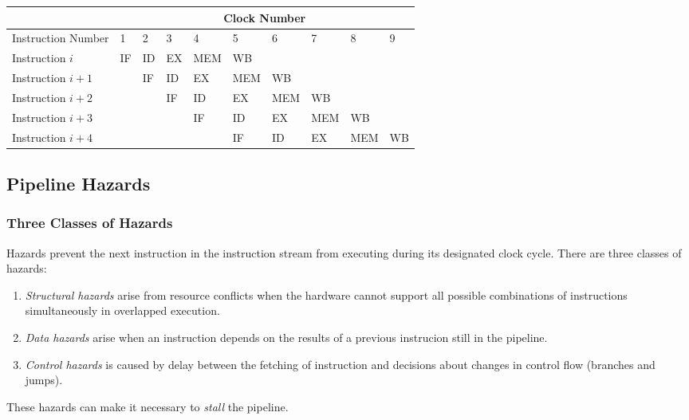 \documentclass[12pt, a4paper]{article}
\theoremstyle{margin}
\begin{document}
      \begin{table}[H]
      \centering
      \begin{tabular}{|l|l|l|l|l|l|l|l|l|l|}
      \hline
                         & \multicolumn{9}{c|}{Clock Number}               \\ \hline
      Instruction Number & 1  & 2  & 3  & 4   & 5   & 6   & 7   & 8   & 9  \\ \hline
      Instruction $i$    & IF & ID & EX & MEM & WB  &     &     &     &    \\ \hline
      Instruction $i+1$  &    & IF & ID & EX  & MEM & WB  &     &     &    \\ \hline
      Instruction $i+2$  &    &    & IF & ID  & EX  & MEM & WB  &     &    \\ \hline
      Instruction $i+3$  &    &    &    & IF  & ID  & EX  & MEM & WB  &    \\ \hline
      Instruction $i+4$  &    &    &    &     & IF  & ID  & EX  & MEM & WB \\ \hline
      \end{tabular}
      \end{table}

  \subsection{Pipeline Hazards}
    \subsubsection{Three Classes of Hazards}

      Hazards prevent the next instruction in the instruction stream from executing during its designated clock cycle. There are three classes of hazards\cite{caqa}:
      \begin{enumerate}
        \item \emph{Structural hazards} arise from resource conflicts when the hardware cannot support all possible combinations of instructions simultaneously in overlapped execution.
        \item \emph{Data hazards} arise when an instruction depends on the results of a previous instrucion still in the pipeline.
        \item \emph{Control hazards} is caused by delay between the fetching of instruction and decisions about changes in control flow (branches and jumps).
      \end{enumerate}

      These hazards can make it necessary to \emph{stall} the pipeline.
\end{document}
